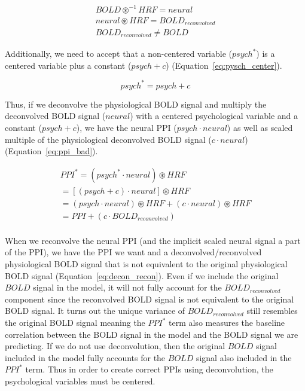 \documentclass[phd,appendix,figures]{uithesis}
\begin{document}
\begin{equation}
  \begin{aligned}
    BOLD \circledast^{-1} HRF = neural \\
    neural \circledast HRF = BOLD_{reconvolved} \\
    BOLD_{reconvolved} \neq BOLD
  \end{aligned}
 \label{eq:decon_recon}
\end{equation}

Additionally, we need to accept that a non-centered variable ($psych^*$)
is a centered variable plus a constant ($psych + c$) (Equation~\ref{eq:pysch_center}).

\begin{equation}
  psych^* = psych + c
 \label{eq:pysch_center}
\end{equation}

Thus, if we deconvolve the physiological BOLD signal and multiply the deconvolved
BOLD signal ($neural$) with a centered psychological variable and a constant
($psych + c$), we have the neural PPI ($psych \cdot neural$)
as well as scaled multiple of the physiological deconvolved BOLD signal
($c \cdot neural$) (Equation~\ref{eq:ppi_bad}).

\begin{equation}
  \begin{aligned}
    PPI^* = (psych^* \cdot neural) \circledast HRF \\
    = [(psych + c) \cdot neural] \circledast HRF \\
    = (psych \cdot neural) \circledast HRF + (c \cdot neural) \circledast HRF \\
    = PPI + (c \cdot BOLD_{reconvolved}) \\
  \end{aligned}
 \label{eq:ppi_bad}
\end{equation}

When we reconvolve the neural PPI (and the implicit scaled neural signal a part of the PPI),
we have the PPI we want and a deconvolved/reconvolved physiological BOLD signal that is not equivalent to the
original physiological BOLD signal (Equation~\ref{eq:decon_recon}).
Even if we include the original $BOLD$ signal in the model, it will not fully account for the 
$BOLD_{reconvolved}$ component since the reconvolved BOLD signal is not equivalent to
the original BOLD signal.
It turns out the unique variance of $BOLD_{reconvolved}$ still resembles the original BOLD signal
meaning the $PPI^*$ term also measures the baseline correlation between the BOLD signal in the model
and the BOLD signal we are predicting.
If we do not use deconvolution, then the original $BOLD$ signal included in the model fully accounts
for the $BOLD$ signal also included in the $PPI^*$ term.
Thus in order to create correct PPIs using deconvolution, the psychological variables must be centered.
\end{document}

